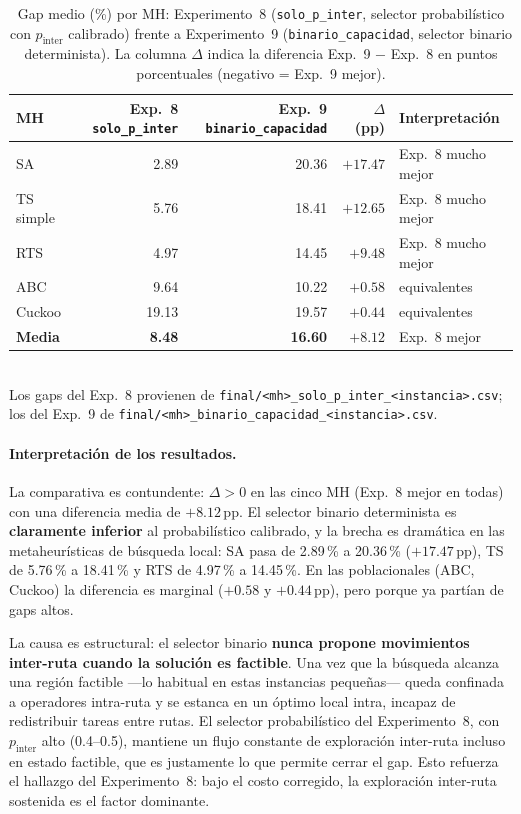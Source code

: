 \begin{table}[h]
\centering
\caption{Gap medio (\%) por MH: Experimento~8 (\texttt{solo\_p\_inter},
         selector probabilístico con $p_{\text{inter}}$ calibrado)
         frente a Experimento~9 (\texttt{binario\_capacidad}, selector
         binario determinista). La columna $\Delta$ indica la diferencia
         Exp.~9 $-$ Exp.~8 en puntos porcentuales (negativo = Exp.~9
         mejor).}
\label{tab:comparativa-exp8-exp9}
\small
\begin{tabular}{lrrrl}
\toprule
MH &
  Exp.~8 \texttt{solo\_p\_inter} &
  Exp.~9 \texttt{binario\_capacidad} &
  $\Delta$ (pp) &
  Interpretación \\
\midrule
SA        & 2.89  & 20.36 & $+17.47$ & Exp.~8 mucho mejor \\
TS simple & 5.76  & 18.41 & $+12.65$ & Exp.~8 mucho mejor \\
RTS       & 4.97  & 14.45 & $+9.48$  & Exp.~8 mucho mejor \\
ABC       & 9.64  & 10.22 & $+0.58$  & equivalentes \\
Cuckoo    & 19.13 & 19.57 & $+0.44$  & equivalentes \\
\midrule
\textbf{Media} &
  \textbf{8.48} & \textbf{16.60} & $+8.12$ & Exp.~8 mejor \\
\bottomrule
\end{tabular}
\\[4pt]
\footnotesize
Los gaps del Exp.~8 provienen de
\texttt{final/<mh>\_solo\_p\_inter\_<instancia>.csv};
los del Exp.~9 de
\texttt{final/<mh>\_binario\_capacidad\_<instancia>.csv}.
\end{table}

\paragraph{Interpretación de los resultados.}
La comparativa es contundente: $\Delta > 0$ en las cinco MH (Exp.~8
mejor en todas) con una diferencia media de $+8.12$\,pp. El selector
binario determinista es \textbf{claramente inferior} al probabilístico
calibrado, y la brecha es dramática en las metaheurísticas de
búsqueda local: SA pasa de 2.89\,\% a 20.36\,\% ($+17.47$\,pp), TS de
5.76\,\% a 18.41\,\% y RTS de 4.97\,\% a 14.45\,\%. En las poblacionales
(ABC, Cuckoo) la diferencia es marginal ($+0.58$ y $+0.44$\,pp), pero
porque ya partían de gaps altos.

La causa es estructural: el selector binario \textbf{nunca propone
movimientos inter-ruta cuando la solución es factible}. Una vez que la
búsqueda alcanza una región factible —lo habitual en estas instancias
pequeñas— queda confinada a operadores intra-ruta y se estanca en un
óptimo local intra, incapaz de redistribuir tareas entre rutas. El
selector probabilístico del Experimento~8, con $p_{\text{inter}}$ alto
(0.4--0.5), mantiene un flujo constante de exploración inter-ruta
incluso en estado factible, que es justamente lo que permite cerrar el
gap. Esto refuerza el hallazgo del Experimento~8: bajo el costo
corregido, la exploración inter-ruta sostenida es el factor dominante.

